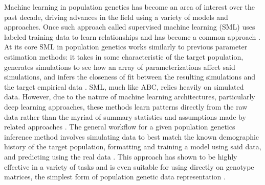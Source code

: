 Machine learning in population genetics has become an area of interest over the past decade, driving advances in the field using a variety of models and approaches. Once such approach called supervised machine learning (SML) uses labeled training data to learn relationships and has become a common approach \cite{korfmannDeepLearningPopulation2023a}. At its core SML in population genetics works similarly to previous parameter estimation methods: it takes in some characteristic of the target population, generates simulations to see how an array of parameterizations affect said simulations, and infers the closeness of fit between the resulting simulations and the target empirical data \cite{schriderSupervisedMachineLearning2018}. SML, much like ABC, relies heavily on simulated data. However, due to the nature of machine learning architectures, particularly deep learning approaches, these methods learn patterns directly from the raw data rather than the myriad of summary statistics and assumptions made by related approaches \cite{lecunBackpropagationAppliedHandwritten1989, lecunDeepLearning2015}. The general workflow for a given population genetics inference method involves simulating data to best match the known demographic history of the target population, formatting and training a model using said data, and predicting using the real data \cite{schriderInferringSelectiveConstraint2015, rayIntroUNETIdentifyingIntrogressed2023, sheehanDeepLearningPopulation2016, schriderHICRobustIdentification2016, wangAutomaticInferenceDemographic2021, kernDiploSHICUpdated2018, moDomainadaptiveNeuralNetworks2023}. This approach has shown to be highly effective in a variety of tasks and is even suitable for using directly on genotype matrices, the simplest form of population genetic data representation \cite{flagelUnreasonableEffectivenessConvolutional2019}.

